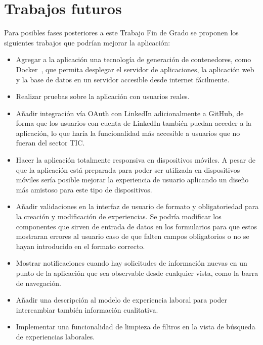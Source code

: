 \documentclass[a4paper, 12pt]{book}
\begin{document}
    \section{Trabajos futuros}
    \label{sec:trabajos_futuros}

    Para posibles fases posteriores a este Trabajo Fin de Grado se proponen los siguientes trabajos que podrían mejorar la aplicación:

    \begin{itemize}
        \item Agregar a la aplicación una tecnología de generación de contenedores, como Docker~\cite{bib:docker}, que permita desplegar
        el servidor de aplicaciones, la aplicación web y la base de datos en un servidor accesible desde internet fácilmente.
        \item Realizar pruebas sobre la aplicación con usuarios reales.
        \item Añadir integración vía OAuth con LinkedIn adicionalmente a GitHub, de forma que los usuarios con cuenta de LinkedIn también puedan acceder a la aplicación,
        lo que haría la funcionalidad más accesible a usuarios que no fueran del sector TIC.
        \item Hacer la aplicación totalmente responsiva en dispositivos móviles.
        A pesar de que la aplicación está preparada para poder ser utilizada en dispositivos móviles sería posible mejorar la experiencia de usuario
        aplicando un diseño más amistoso para este tipo de dispositivos.
        \item Añadir validaciones en la interfaz de usuario de formato y obligatoriedad para la creación y modificación de experiencias.
        Se podría modificar los componentes que sirven de entrada de datos en los formularios para que estos mostraran errores al usuario
        caso de que falten campos obligatorios o no se hayan introducido en el formato correcto.
        \item Mostrar notificaciones cuando hay solicitudes de información nuevas en un punto de la aplicación que sea observable desde cualquier vista, como la barra de navegación.
        \item Añadir una descripción al modelo de experiencia laboral para poder intercambiar también información cualitativa.
        \item Implementar una funcionalidad de limpieza de filtros en la vista de búsqueda de experiencias laborales.
    \end{itemize}
\end{document}

